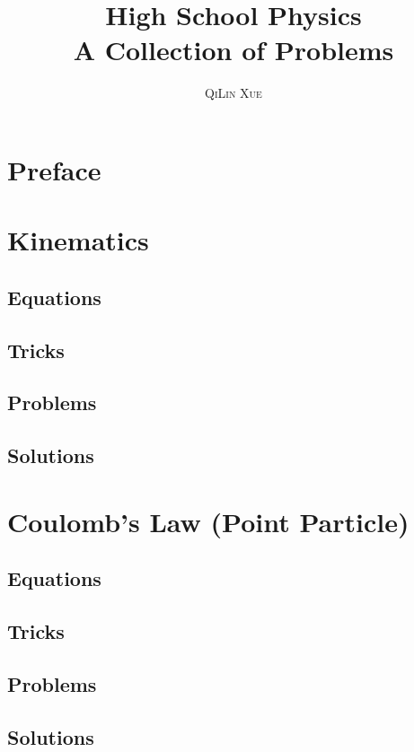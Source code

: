 \documentclass[a4paper,11pt,oneside]{book}
\title{\Huge \textbf{High School Physics} \\ \huge A Collection of Problems}
\author{\textsc{QiLin Xue}}
\begin{document}
\maketitle
\tableofcontents

\chapter*{Preface}


\chapter{Kinematics}


\section{Equations}


\section{Tricks}


\newpage
\section{Problems}


\newpage
\section{Solutions}
\printsolutions[chapter]

\chapter{Coulomb's Law (Point Particle)}


\section{Equations}


\section{Tricks}


\newpage
\section{Problems}


\newpage
\section{Solutions}
\printsolutions[chapter]
\end{document}
